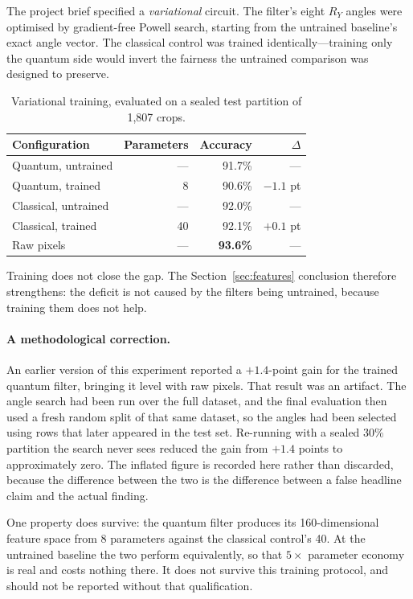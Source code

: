 \documentclass[11pt,a4paper]{article}
\begin{document}
The project brief specified a \emph{variational} circuit. The filter's eight
$R_Y$ angles were optimised by gradient-free Powell search, starting from the
untrained baseline's exact angle vector. The classical control was trained
identically---training only the quantum side would invert the fairness the
untrained comparison was designed to preserve.

\begin{table}[h]
\centering
\caption{Variational training, evaluated on a sealed test partition of 1{,}807
crops.}
\begin{tabular}{@{}lrrr@{}}
\toprule
Configuration & Parameters & Accuracy & $\Delta$ \\
\midrule
Quantum, untrained & --- & 91.7\% & --- \\
Quantum, trained & 8 & 90.6\% & $-1.1$ pt \\
Classical, untrained & --- & 92.0\% & --- \\
Classical, trained & 40 & 92.1\% & $+0.1$ pt \\
Raw pixels & --- & \textbf{93.6\%} & --- \\
\bottomrule
\end{tabular}
\end{table}

Training does not close the gap. The Section~\ref{sec:features} conclusion
therefore strengthens: the deficit is not caused by the filters being untrained,
because training them does not help.

\paragraph{A methodological correction.} An earlier version of this experiment
reported a $+1.4$-point gain for the trained quantum filter, bringing it level
with raw pixels. That result was an artifact. The angle search had been run over
the full dataset, and the final evaluation then used a fresh random split of that
same dataset, so the angles had been selected using rows that later appeared in
the test set. Re-running with a sealed 30\% partition the search never sees
reduced the gain from $+1.4$ points to approximately zero. The inflated figure is
recorded here rather than discarded, because the difference between the two is
the difference between a false headline claim and the actual finding.

One property does survive: the quantum filter produces its 160-dimensional
feature space from 8 parameters against the classical control's 40. At the
untrained baseline the two perform equivalently, so that $5\times$ parameter
economy is real and costs nothing there. It does not survive this training
protocol, and should not be reported without that qualification.
\end{document}
